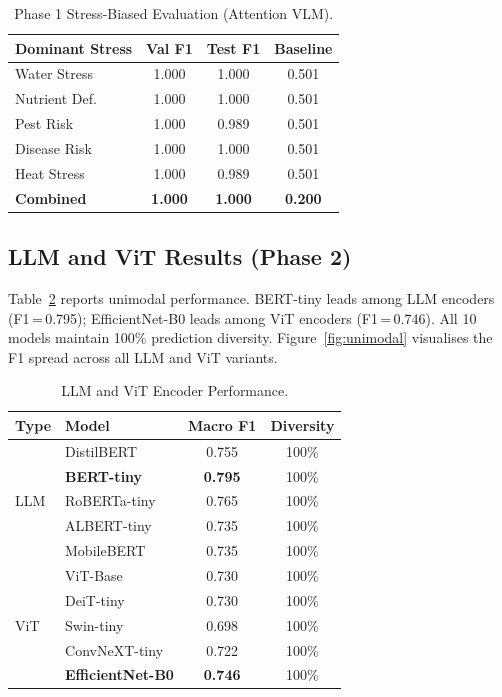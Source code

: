 \documentclass[conference]{IEEEtran}
\begin{document}
\begin{table}[t]
\caption{Phase 1 Stress-Biased Evaluation (Attention VLM).}
\label{tab:phase1}
\centering\footnotesize
\setlength\tabcolsep{4pt}
\begin{tabular}{lccc}
\toprule
\textbf{Dominant Stress} & \textbf{Val F1} & \textbf{Test F1} & \textbf{Baseline}\\
\midrule
Water Stress    & 1.000 & 1.000 & 0.501 \\
Nutrient Def.   & 1.000 & 1.000 & 0.501 \\
Pest Risk       & 1.000 & 0.989 & 0.501 \\
Disease Risk    & 1.000 & 1.000 & 0.501 \\
Heat Stress     & 1.000 & 0.989 & 0.501 \\
\midrule
\textbf{Combined} & \textbf{1.000} & \textbf{1.000} & \textbf{0.200} \\
\bottomrule
\end{tabular}
\end{table}

\subsection{LLM and ViT Results (Phase 2)}

Table~\ref{tab:unimodal} reports unimodal performance. BERT-tiny leads
among LLM encoders (F1\,=\,0.795); EfficientNet-B0 leads among ViT
encoders (F1\,=\,0.746). All 10 models maintain 100\% prediction diversity.
Figure~\ref{fig:unimodal} visualises the F1 spread across all LLM and ViT
variants.

\begin{table}[t]
\caption{LLM and ViT Encoder Performance.}
\label{tab:unimodal}
\centering\footnotesize
\setlength\tabcolsep{4pt}
\begin{tabular}{llcc}
\toprule
\textbf{Type} & \textbf{Model} & \textbf{Macro F1} & \textbf{Diversity}\\
\midrule
\multirow{5}{*}{LLM}
  & DistilBERT    & 0.755 & 100\% \\
  & \cellcolor{llmblue!40}\textbf{BERT-tiny}
                   & \cellcolor{llmblue!40}\textbf{0.795} & \cellcolor{llmblue!40}100\% \\
  & RoBERTa-tiny  & 0.765 & 100\% \\
  & ALBERT-tiny   & 0.735 & 100\% \\
  & MobileBERT    & 0.735 & 100\% \\
\midrule
\multirow{5}{*}{ViT}
  & ViT-Base      & 0.730 & 100\% \\
  & DeiT-tiny     & 0.730 & 100\% \\
  & Swin-tiny     & 0.698 & 100\% \\
  & ConvNeXT-tiny & 0.722 & 100\% \\
  & \cellcolor{vitgreen!40}\textbf{EfficientNet-B0}
                   & \cellcolor{vitgreen!40}\textbf{0.746} & \cellcolor{vitgreen!40}100\% \\
\bottomrule
\end{tabular}
\end{table}
\end{document}
